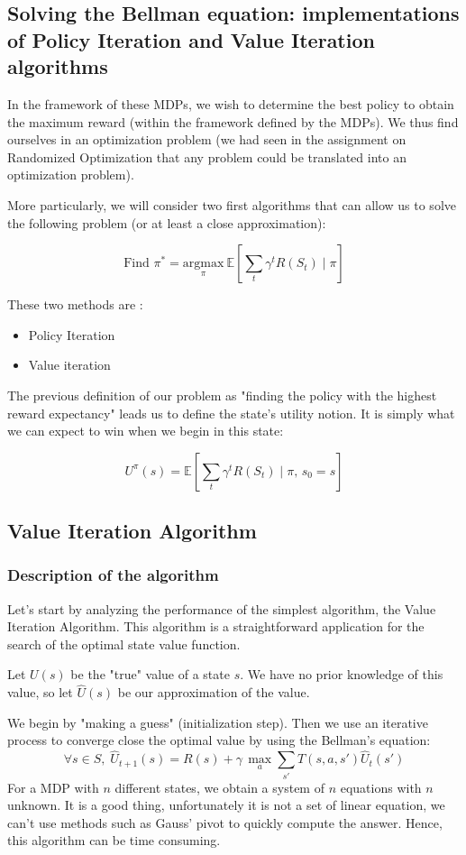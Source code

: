 \documentclass[11pt]{article}
\begin{document}
\begin{multicols}{2}
\section{Solving the Bellman equation: implementations of Policy Iteration and Value Iteration algorithms}

In the framework of these MDPs, we wish to determine the best policy to obtain the maximum reward (within the framework defined by the MDPs). We thus find ourselves in an optimization problem (we had seen in the assignment on Randomized Optimization that any problem could be translated into an optimization problem).

More particularly, we will consider two first algorithms that can allow us to solve the following problem (or at least a close approximation):

$$\text{Find } \pi^{*} = \underset{\pi}{\text{argmax}} \: \mathbb{E} \left[ \sum_t \gamma^t R(S_t) \; | \; \pi \right]$$

These two methods are : 
\begin{itemize}
\item Policy Iteration
\item Value iteration
\end{itemize}

The previous definition of our problem as "finding the policy with the highest reward expectancy" leads us to define the state's utility notion. It is simply what we can expect to win when we begin in this state:

$$ U^\pi(s)=\mathbb{E} \left[ \sum_t \gamma^t R(S_t) \; | \; \pi, \, s_0 = s \right]$$ 

\subsection{Value Iteration Algorithm}

\subsubsection{Description of the algorithm}
Let's start by analyzing the performance of the simplest algorithm, the Value Iteration Algorithm. This algorithm is a straightforward application for the search of the optimal state value function.

Let $U(s)$ be the "true" value of a state $s$. We have no prior knowledge of this value, so let $\hat{U}(s)$ be our approximation of the value.

We begin by "making a guess" (initialization step). Then we use an iterative process to converge close the optimal value by using the Bellman's equation:
$$\forall s \in S, \; \hat{U}_{t+1}(s) = R(s) + \gamma\, \underset{a}{\max} \sum_{s'} T(s, a, s')\hat{U}_t(s')$$
For a MDP with $n$ different states, we obtain a system of $n$ equations with $n$ unknown. It is a good thing, unfortunately it is not a set of linear equation, we can't use methods such as Gauss' pivot to quickly compute the answer. Hence, this algorithm can be time consuming.


\end{multicols}
\end{document}
